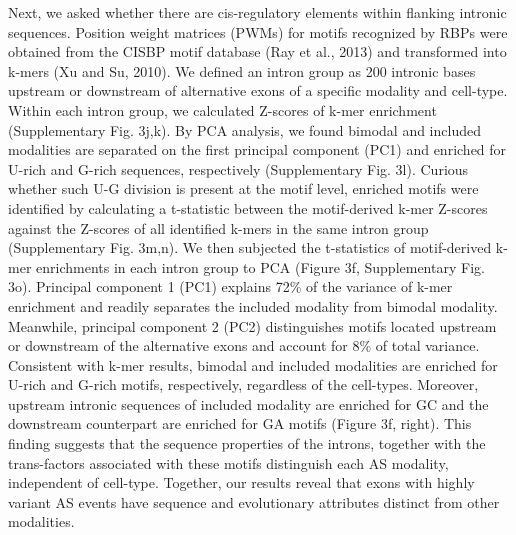 Next, we asked whether there are cis-regulatory elements within flanking intronic sequences. Position weight matrices (PWMs) for motifs recognized by RBPs were obtained from the CISBP motif database (Ray et al., 2013) and transformed into k-mers (Xu and Su, 2010). We defined an intron group as 200 intronic bases upstream or downstream of alternative exons of a specific modality and cell-type. Within each intron group, we calculated Z-scores of k-mer enrichment (Supplementary Fig. 3j,k). By PCA analysis, we found bimodal and included modalities are separated on the first principal component (PC1) and enriched for U-rich and G-rich sequences, respectively (Supplementary Fig. 3l). Curious whether such U-G division is present at the motif level, enriched motifs were identified by calculating a t-statistic between the motif-derived k-mer Z-scores against the Z-scores of all identified k-mers in the same intron group (Supplementary Fig. 3m,n). We then subjected the t-statistics of motif-derived k-mer enrichments in each intron group to PCA (Figure 3f, Supplementary Fig. 3o). Principal component 1 (PC1) explains 72\% of the variance of k-mer enrichment and readily separates the included modality from bimodal modality. Meanwhile, principal component 2 (PC2) distinguishes motifs located upstream or downstream of the alternative exons and account for 8\% of total variance. Consistent with k-mer results, bimodal and included modalities are enriched for U-rich and G-rich motifs, respectively, regardless of the cell-types. Moreover, upstream intronic sequences of included modality are enriched for GC and the downstream counterpart are enriched for GA motifs (Figure 3f, right). This finding suggests that the sequence properties of the introns, together with the trans-factors associated with these motifs distinguish each AS modality, independent of cell-type. Together, our results reveal that exons with highly variant AS events have sequence and evolutionary attributes distinct from other modalities.

